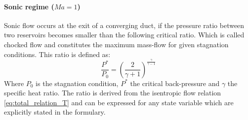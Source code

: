 	\paragraph{Sonic regime ($Ma = 1$)}
		Sonic flow occurs at the exit of a converging duct, if the pressure ratio between two reservoirs becomes smaller than the following critical ratio.
		Which is called chocked flow and constitutes the maximum mass-flow for given stagnation conditions. 
		This ratio is defined as:
		\begin{equation}
			\frac{P^*}{P_0}=\left(\frac{2}{\gamma + 1}\right)^{\frac{\gamma}{\gamma - 1}}
			\label{eq:critical-pressure}
		\end{equation}
		Where $P_0$ is the stagnation condition, $P^*$ the critical back-pressure and $\gamma$ the specific heat ratio.
		The ratio is derived from the isentropic flow relation \eqref{eq:total_relation_T} and can be expressed for any state variable which are explicitly stated in the formulary.

